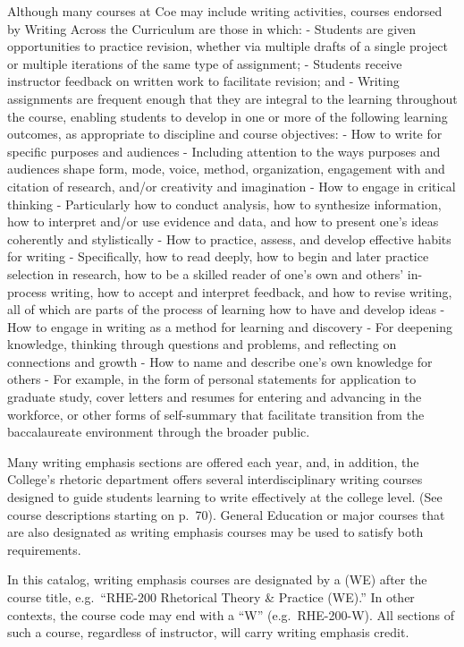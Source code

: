 \documentclass[
  letterpaper,
]{scrbook}
\begin{document}
Although many courses at Coe may include writing activities, courses
endorsed by Writing Across the Curriculum are those in which: - Students
are given opportunities to practice revision, whether via multiple
drafts of a single project or multiple iterations of the same type of
assignment; - Students receive instructor feedback on written work to
facilitate revision; and - Writing assignments are frequent enough that
they are integral to the learning throughout the course, enabling
students to develop in one or more of the following learning outcomes,
as appropriate to discipline and course objectives: - How to write for
specific purposes and audiences - Including attention to the ways
purposes and audiences shape form, mode, voice, method, organization,
engagement with and citation of research, and/or creativity and
imagination - How to engage in critical thinking - Particularly how to
conduct analysis, how to synthesize information, how to interpret and/or
use evidence and data, and how to present one's ideas coherently and
stylistically - How to practice, assess, and develop effective habits
for writing - Specifically, how to read deeply, how to begin and later
practice selection in research, how to be a skilled reader of one's own
and others' in-process writing, how to accept and interpret feedback,
and how to revise writing, all of which are parts of the process of
learning how to have and develop ideas - How to engage in writing as a
method for learning and discovery - For deepening knowledge, thinking
through questions and problems, and reflecting on connections and growth
- How to name and describe one's own knowledge for others - For example,
in the form of personal statements for application to graduate study,
cover letters and resumes for entering and advancing in the workforce,
or other forms of self-summary that facilitate transition from the
baccalaureate environment through the broader public.

Many writing emphasis sections are offered each year, and, in addition,
the College's rhetoric department offers several interdisciplinary
writing courses designed to guide students learning to write effectively
at the college level. (See course descriptions starting on p.~70).
General Education or major courses that are also designated as writing
emphasis courses may be used to satisfy both requirements.

In this catalog, writing emphasis courses are designated by a (WE) after
the course title, e.g.~``RHE-200 Rhetorical Theory \& Practice (WE).''
In other contexts, the course code may end with a ``W''
(e.g.~RHE-200-W). All sections of such a course, regardless of
instructor, will carry writing emphasis credit.
\end{document}
